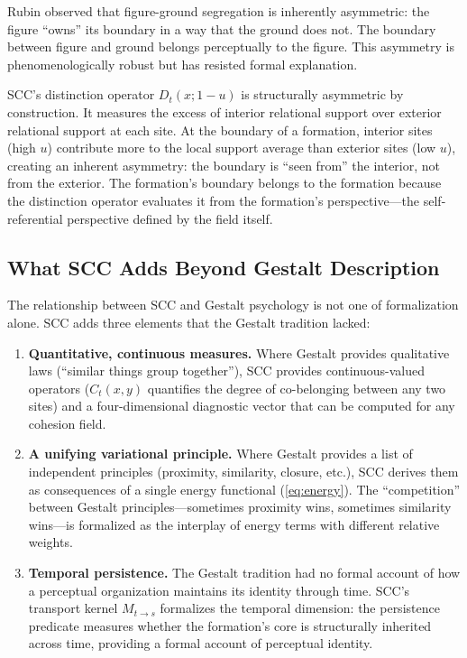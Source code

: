 \documentclass[lettersize,journal]{IEEEtran}
\begin{document}
Rubin \cite{rubin1921visuell} observed that figure-ground segregation is inherently asymmetric: the figure ``owns'' its boundary in a way that the ground does not. The boundary between figure and ground belongs perceptually to the figure. This asymmetry is phenomenologically robust but has resisted formal explanation.

SCC's distinction operator $D_t(x; 1-u)$ is structurally asymmetric by construction. It measures the excess of interior relational support over exterior relational support at each site. At the boundary of a formation, interior sites (high $u$) contribute more to the local support average than exterior sites (low $u$), creating an inherent asymmetry: the boundary is ``seen from'' the interior, not from the exterior. The formation's boundary belongs to the formation because the distinction operator evaluates it from the formation's perspective---the self-referential perspective defined by the field itself.

\subsection{What SCC Adds Beyond Gestalt Description}

The relationship between SCC and Gestalt psychology is not one of formalization alone. SCC adds three elements that the Gestalt tradition lacked:

\begin{enumerate}
\item \textbf{Quantitative, continuous measures.} Where Gestalt provides qualitative laws (``similar things group together''), SCC provides continuous-valued operators ($C_t(x,y)$ quantifies the degree of co-belonging between any two sites) and a four-dimensional diagnostic vector that can be computed for any cohesion field.

\item \textbf{A unifying variational principle.} Where Gestalt provides a list of independent principles (proximity, similarity, closure, etc.), SCC derives them as consequences of a single energy functional (\ref{eq:energy}). The ``competition'' between Gestalt principles---sometimes proximity wins, sometimes similarity wins---is formalized as the interplay of energy terms with different relative weights.

\item \textbf{Temporal persistence.} The Gestalt tradition had no formal account of how a perceptual organization maintains its identity through time. SCC's transport kernel $M_{t \to s}$ formalizes the temporal dimension: the persistence predicate measures whether the formation's core is structurally inherited across time, providing a formal account of perceptual identity.
\end{enumerate}
\end{document}
